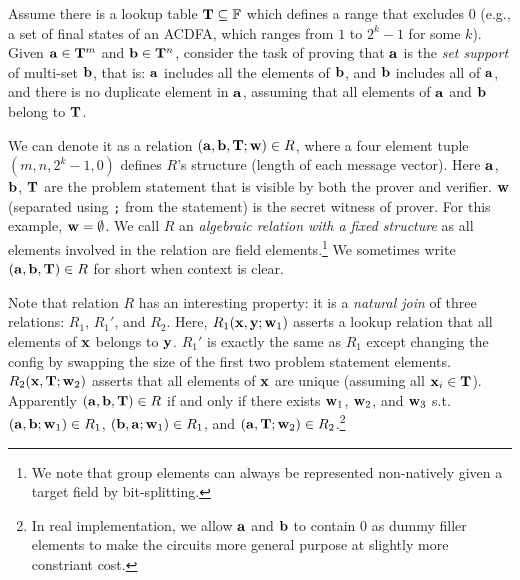 \begin{example} \label{examp:ir1cs}
Assume there is a lookup table ${{\mathbf {T}}} \subseteq \mathbb{F}$ which defines
a range that excludes $0$ (e.g., a set of final states of an ACDFA,
which ranges from $1$ to $2^{k}-1$ for some $k$).
Given ${{\mathbf {a}}} \in {{\mathbf {T}}}^{m}$ and ${{\mathbf {b}}} \in {{\mathbf {T}}}^n$,
consider the task of proving that ${{\mathbf {a}}}$ is the {\em set support}
of multi-set ${{\mathbf {b}}}$, that is: ${{\mathbf {a}}}$ includes all the elements of
${{\mathbf {b}}}$, and ${{\mathbf {b}}}$ includes all of ${{\mathbf {a}}}$, and there is no duplicate element in ${{\mathbf {a}}}$, assuming that all elements of
${{\mathbf {a}}}$ and ${{\mathbf {b}}}$ belong to ${{\mathbf {T}}}$.

We can denote it as a relation 
$({{\mathbf {a}}}, {{\mathbf {b}}}, {{\mathbf {T}}}; {{\mathbf {w}}}) \in R$, where
a four element tuple $(m,n,2^{k}-1, 0)$ defines $R$'s structure (length
of each message vector).
Here ${{\mathbf {a}}}$, ${{\mathbf {b}}}$, ${{\mathbf {T}}}$ are the
problem statement that 
is visible by both the prover and verifier.
${{\mathbf {w}}}$ (separated using \texttt{;} from the statement)
is the secret witness of prover. For this example,
${{\mathbf {w}}} = \emptyset$.
We call $R$ an {\em algebraic relation with a fixed structure} 
as all elements involved
in the relation are field elements.\footnote{We note that 
group elements can always be represented non-natively given a 
target field by bit-splitting.} 
We sometimes write $({{\mathbf {a}}}, {{\mathbf {b}}}, {{\mathbf {T}}}) \in R$
for short when context is clear.

Note that relation $R$ has an interesting property: it is a 
{\em natural join} of three 
relations: $R_1$, $R_1'$, and $R_2$. Here, 
$R_1({{\mathbf {x}}},{{\mathbf {y}}};{{\mathbf {w}}}_1)$ asserts a lookup relation
that all elements of ${{\mathbf {x}}}$ belongs to ${{\mathbf {y}}}$.
$R_1'$ is exactly the same as $R_1$ except changing
the config by swapping the size of the first 
two problem statement elements.
$R_2({{\mathbf {x}}}, {{\mathbf {T}}};{{\mathbf {w}}}_2)$ asserts that
all elements of ${{\mathbf {x}}}$ are unique (assuming all 
${{\mathbf {x}}}_i \in {{\mathbf {T}}}$).
Apparently $({{\mathbf {a}}}, {{\mathbf {b}}}, {{\mathbf {T}}}) \in R$ if and only if 
there exists ${{\mathbf {w}}}_1$, ${{\mathbf {w}}}_2$, and ${{\mathbf {w}}}_3$ s.t.
${{\mathbf {(}}}{{\mathbf {a}}}, {{\mathbf {b}}}; {{\mathbf {w}}}_1) \in R_1$,
${{\mathbf {(}}}{{\mathbf {b}}}, {{\mathbf {a}}}; {{\mathbf {w}}}_1) \in R_1$,
and ${{\mathbf {(}}}{{\mathbf {a}}}, {{\mathbf {T}}}; {{\mathbf {w}}}_2) \in R_2$.\footnote{In 
real implementation, we allow ${{\mathbf {a}}}$ and ${{\mathbf {b}}}$ to
contain $0$ as dummy filler elements to make the circuits
more general purpose at slightly more constriant cost.}


\end{example}
